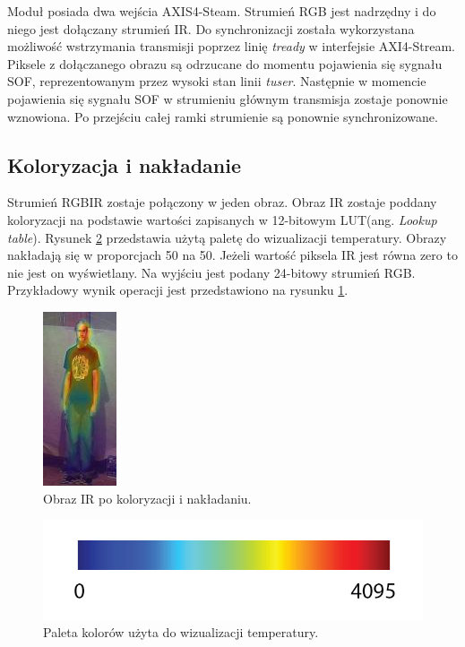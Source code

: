 Moduł posiada dwa wejścia AXIS4-Steam. Strumień RGB jest nadrzędny i do niego jest dołączany strumień IR. %
Do synchronizacji została wykorzystana możliwość wstrzymania transmisji poprzez linię \textit{tready} w interfejsie AXI4-Stream.
Piksele z dołączanego obrazu są odrzucane do momentu pojawienia się sygnału SOF, reprezentowanym przez wysoki stan linii \textit{tuser}. Następnie w momencie pojawienia się sygnału SOF w strumieniu głównym transmisja zostaje ponownie wznowiona. %
Po przejściu całej ramki strumienie są ponownie synchronizowane.
\subsection{Koloryzacja i nakładanie}
Strumień RGBIR zostaje połączony w jeden obraz.
Obraz IR zostaje poddany koloryzacji na podstawie wartości zapisanych w 12-bitowym LUT(ang. \textit{Lookup table}). Rysunek \ref{fig:jetPalet} przedstawia użytą paletę do wizualizacji temperatury. Obrazy nakładają się w proporcjach 50 na 50. Jeżeli wartość piksela IR jest równa zero to nie jest on wyświetlany.
Na wyjściu jest podany 24-bitowy strumień RGB. Przykładowy wynik operacji jest przedstawiono na rysunku \ref{fig:koloryzacja}.
\begin{figure}
\centering
\includegraphics[width=0.3\linewidth]{images/koloryzacja.jpg}
\caption[Obraz IR po koloryzacji i nakłądaniu.]{Obraz IR po koloryzacji i nakładaniu.}
\label{fig:koloryzacja}
\end{figure}

\begin{figure}
\centering
\includegraphics[width=0.5\linewidth]{images/jetPalet.png}
\caption[Paleta kolorów użyta do wizualizacji temperatury.]{Paleta kolorów użyta do wizualizacji temperatury.}
\label{fig:jetPalet}
\end{figure}
